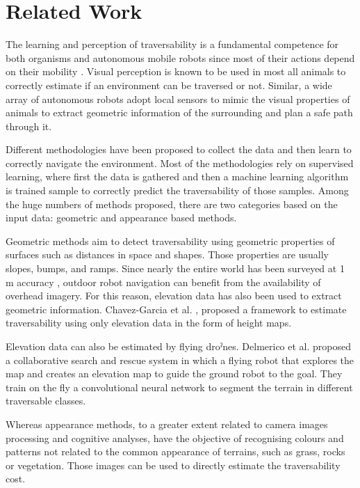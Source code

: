 \documentclass[../document.tex]{subfiles}
\begin{document}
\section{Related Work}
The learning and perception of traversability is
a fundamental competence for both organisms and autonomous mobile robots since most of their
actions depend on their mobility \cite{ugur2010traversability}. 
Visual perception is known to be used in most all animals to correctly estimate if an environment can be traversed or not.
Similar, a wide array of autonomous robots adopt local sensors to mimic the visual properties of animals to extract geometric information of the surrounding and plan a safe path through it. 

Different methodologies have been proposed to collect the data and then learn to correctly navigate the environment.
Most of the methodologies rely on supervised learning, where first the data is gathered and then a machine learning algorithm is trained sample to correctly predict the traversability of those samples.
Among the huge numbers of methods proposed, there are two categories based on the input data: geometric and appearance based methods. 

Geometric methods aim to detect traversability using geometric properties of surfaces such as distances in space and shapes. Those properties are usually slopes, bumps, and ramps. Since nearly the entire world has been surveyed at 1 m accuracy \cite{sofman2006improving}, 
outdoor robot navigation can benefit from the availability of overhead imagery. For this reason, elevation data has also been used to extract geometric information. Chavez-Garcia et al. \cite{omar2018traversability}, proposed a framework to estimate traversability using only elevation data in the form of height maps. 

Elevation data can also be estimated by flying droˀnes. Delmerico et al. \cite{delmerico2016active} proposed a collaborative search and rescue system in which a flying robot that explores the map and creates an elevation map to guide the ground robot to the goal. They train on the fly a convolutional neural network to segment the terrain in different traversable classes.  

Whereas appearance methods, to a greater extent related to camera images processing and cognitive analyses, have the objective of recognising colours and patterns not related to the common appearance of terrains, such as grass, rocks or vegetation. Those images can be used to directly estimate the traversability cost. 
\end{document}
